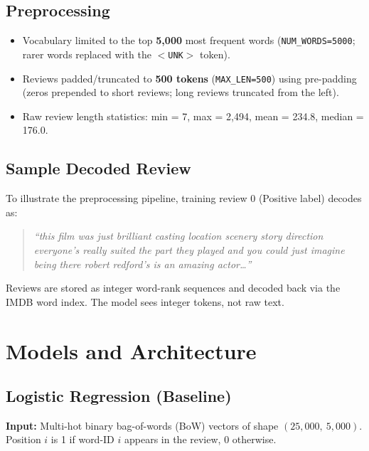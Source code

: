 \documentclass[12pt,a4paper]{article}
\begin{document}
\subsection*{Preprocessing}
\begin{itemize}
  \item Vocabulary limited to the top \textbf{5,000} most frequent words
        (\texttt{NUM\_WORDS=5000}; rarer words replaced with the \texttt{$<$UNK$>$} token).
  \item Reviews padded/truncated to \textbf{500 tokens} (\texttt{MAX\_LEN=500}) using
        pre-padding (zeros prepended to short reviews; long reviews truncated from the
        left).
  \item Raw review length statistics: min = 7, max = 2,494, mean = 234.8, median = 176.0.
\end{itemize}

\subsection*{Sample Decoded Review}
To illustrate the preprocessing pipeline, training review 0 (Positive label) decodes as:

\begin{quote}
\textit{``this film was just brilliant casting location scenery story direction
everyone's really suited the part they played and you could just imagine being there
robert redford's is an amazing actor\ldots''}
\end{quote}

Reviews are stored as integer word-rank sequences and decoded back via the IMDB word
index. The model sees integer tokens, not raw text.

\section{Models and Architecture}

\subsection{Logistic Regression (Baseline)}

\textbf{Input:} Multi-hot binary bag-of-words (BoW) vectors of shape
$(25{,}000,\ 5{,}000)$. Position $i$ is 1 if word-ID $i$ appears in the review, 0
otherwise.
\end{document}

